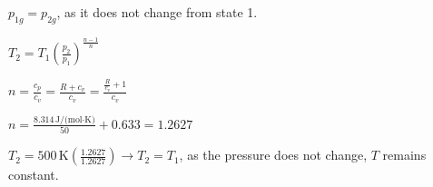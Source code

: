\( p_{1g} = p_{2g} \), as it does not change from state 1.  

\( T_2 = T_1 \left( \frac{p_2}{p_1} \right)^{\frac{n-1}{n}} \)  

\( n = \frac{c_p}{c_v} = \frac{R + c_v}{c_v} = \frac{\frac{R}{c_v} + 1}{c_v} \)  

\( n = \frac{8.314 \, \text{J/(mol·K)}}{50} + 0.633 = 1.2627 \)  

\( T_2 = 500 \, \text{K} \left( \frac{1.2627}{1.2627} \right) \rightarrow T_2 = T_1 \), as the pressure does not change, \( T \) remains constant.